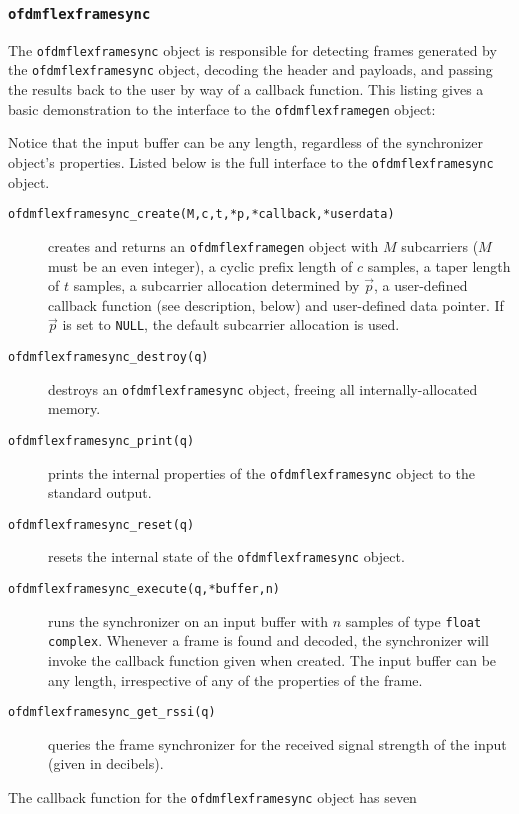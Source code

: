 \subsubsection{{\tt ofdmflexframesync}}
\label{module:framing:ofdmflexframe:sync}
%
The {\tt ofdmflexframesync} object is responsible for detecting frames
generated by the {\tt ofdmflexframesync} object, decoding the header and
payloads, and passing the results back to the user by way of a callback
function.
%
This listing gives a basic demonstration to the interface to the
{\tt ofdmflexframegen} object:
%

%
Notice that the input buffer can be any length, regardless of the
synchronizer object's properties.
Listed below is the full interface to the {\tt ofdmflexframesync}
object.
%
\begin{description}
%
\item[{\tt ofdmflexframesync\_create(M,c,t,*p,*callback,*userdata)}]
    creates and returns an {\tt ofdmflexframegen} object
    with $M$ subcarriers ($M$ must be an even integer),
    a cyclic prefix length of $c$ samples,
    a taper length of $t$ samples,
    a subcarrier allocation determined by $\vec{p}$,
    a user-defined callback function (see description, below)
    and user-defined data pointer.
    If $\vec{p}$ is set to {\tt NULL}, the default subcarrier allocation
    is used.
%
\item[{\tt ofdmflexframesync\_destroy(q)}]
    destroys an {\tt ofdmflexframesync} object, freeing all
    internally-allocated memory.
%
\item[{\tt ofdmflexframesync\_print(q)}]
    prints the internal properties of the {\tt ofdmflexframesync}
    object to the standard output.
%
\item[{\tt ofdmflexframesync\_reset(q)}]
    resets the internal state of the {\tt ofdmflexframesync} object.
%
\item[{\tt ofdmflexframesync\_execute(q,*buffer,n)}]
    runs the synchronizer on an input buffer with $n$ samples of type
    {\tt float complex}.
    Whenever a frame is found and decoded, the synchronizer will invoke
    the callback function given when created.
    The input buffer can be any length, irrespective of any of the
    properties of the frame.
%
\item[{\tt ofdmflexframesync\_get\_rssi(q)}]
    queries the frame synchronizer for the received signal strength of
    the input (given in decibels).
%
\end{description}
%
%
%
The callback function for the {\tt ofdmflexframesync} object has seven
